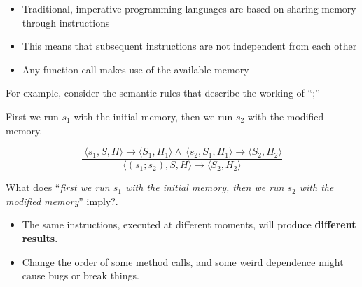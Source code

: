 \documentclass{beamer}
\begin{document}
\begin{frame}[fragile]{\CurrentSection}
\begin{exampleblock}{}
\begin{itemize}
\item Traditional, imperative programming languages are based on sharing memory through instructions
\item This means that subsequent instructions are not independent from each other
\item Any function call makes use of the available memory

\end{itemize}

\end{exampleblock}

 

\end{frame}

\begin{frame}[fragile]{\CurrentSection}
\begin{exampleblock}{}
For example, consider the semantic rules that describe the working of ``;''
\end{exampleblock}

 
\begin{exampleblock}{}
First we run $s_1$ with the initial memory, then we run $s_2$ with the modified memory.
\end{exampleblock}

 
\pause 
$$\frac{\ \langle s_1,S,H \rangle \rightarrow \langle S_1,H_1 \rangle\wedge\ \langle s_2,S_1,H_1 \rangle \rightarrow \langle S_2,H_2 \rangle}{\langle (s_1;s_2),S,H \rangle \rightarrow \langle S_2,H_2 \rangle}$$
 

\end{frame}

\begin{frame}[fragile]{\CurrentSection}
\begin{exampleblock}{}
What does ``\textit{first we run $s_1$ with the initial memory, then we run $s_2$ with the modified memory}'' imply?.
\end{exampleblock}

 
\pause 
\begin{exampleblock}{}
\begin{itemize}
\item The same instructions, executed at different moments, will produce \textbf{different results}.
\item Change the order of some method calls, and some weird dependence might cause bugs or break things.

\end{itemize}

\end{exampleblock}

 

\end{frame}
\end{document}
